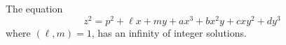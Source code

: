 \begin{proposition}\label{eq:104}
    The equation
\[
    z^2=p^2+\ell x+my+ax^3+bx^2y+cxy^2+dy^3
\]
    where $(\ell,m)=1$, has an infinity of integer solutions.
\end{proposition}

